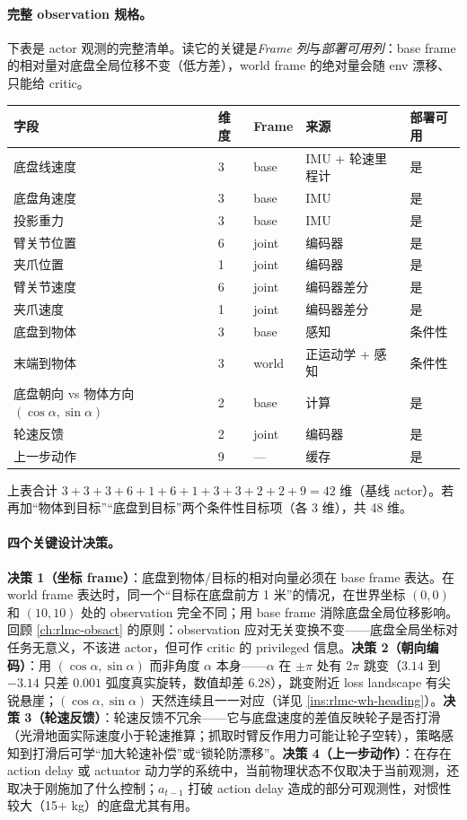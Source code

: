 \paragraph{完整 observation 规格。}下表是 actor 观测的完整清单。读它的关键是\emph{Frame 列}与\emph{部署可用列}：base frame 的相对量对底盘全局位移不变（低方差），world frame 的绝对量会随 env 漂移、只能给 critic。

\begin{center}
\small
\begin{tabular}{@{}lllll@{}}
\toprule
字段 & 维度 & Frame & 来源 & 部署可用 \\
\midrule
底盘线速度 & 3 & base & IMU + 轮速里程计 & 是 \\
底盘角速度 & 3 & base & IMU & 是 \\
投影重力 & 3 & base & IMU & 是 \\
臂关节位置 & 6 & joint & 编码器 & 是 \\
夹爪位置 & 1 & joint & 编码器 & 是 \\
臂关节速度 & 6 & joint & 编码器差分 & 是 \\
夹爪速度 & 1 & joint & 编码器差分 & 是 \\
底盘到物体 & 3 & base & 感知 & 条件性 \\
末端到物体 & 3 & world & 正运动学 + 感知 & 条件性 \\
底盘朝向 vs 物体方向 $(\cos\alpha,\sin\alpha)$ & 2 & base & 计算 & 是 \\
轮速反馈 & 2 & joint & 编码器 & 是 \\
上一步动作 & 9 & --- & 缓存 & 是 \\
\bottomrule
\end{tabular}
\end{center}

上表合计 $3+3+3+6+1+6+1+3+3+2+2+9=42$ 维（基线 actor）。若再加“物体到目标”“底盘到目标”两个条件性目标项（各 3 维），共 48 维。

\paragraph{四个关键设计决策。}\textbf{决策 1（坐标 frame）}：底盘到物体/目标的相对向量必须在 base frame 表达。在 world frame 表达时，同一个“目标在底盘前方 1 米”的情况，在世界坐标 $(0,0)$ 和 $(10,10)$ 处的 observation 完全不同；用 base frame 消除底盘全局位移影响。回顾 \cref{ch:rlmc-obsact} 的原则：observation 应对无关变换不变——底盘全局坐标对任务无意义，不该进 actor，但可作 critic 的 privileged 信息。\textbf{决策 2（朝向编码）}：用 $(\cos\alpha,\sin\alpha)$ 而非角度 $\alpha$ 本身——$\alpha$ 在 $\pm\pi$ 处有 $2\pi$ 跳变（$3.14$ 到 $-3.14$ 只差 $0.001$ 弧度真实旋转，数值却差 $6.28$），跳变附近 loss landscape 有尖锐悬崖；$(\cos\alpha,\sin\alpha)$ 天然连续且一一对应（详见 \cref{ins:rlmc-wh-heading}）。\textbf{决策 3（轮速反馈）}：轮速反馈不冗余——它与底盘速度的差值反映轮子是否打滑（光滑地面实际速度小于轮速推算；抓取时臂反作用力可能让轮子空转），策略感知到打滑后可学“加大轮速补偿”或“锁轮防漂移”。\textbf{决策 4（上一步动作）}：在存在 action delay 或 actuator 动力学的系统中，当前物理状态不仅取决于当前观测，还取决于刚施加了什么控制；$a_{t-1}$ 打破 action delay 造成的部分可观测性，对惯性较大（15+ kg）的底盘尤其有用。

